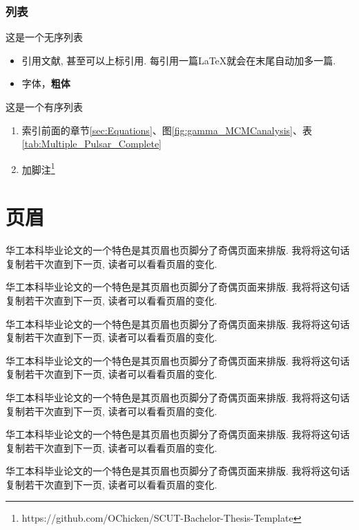 \documentclass{scutbthesis}
\begin{document}
\subsubsection{列表}
\label{sec:font_list_etc:list}
这是一个无序列表
\begin{itemize}
\item 引用文献\cite{long2015fully}, 甚至可以上标引用. 每引用一篇\LaTeX 就会在末尾自动加多一篇.
\item 字体{\color{red}{变红}}，\textbf{粗体}
\end{itemize}

这是一个有序列表
\begin{enumerate}
\item 索引前面的章节\ref{sec:Equations}、图\ref{fig:gamma_MCMCanalysis}、表\ref{tab:Multiple_Pulsar_Complete}
\item 加脚注\footnote{https://github.com/OChicken/SCUT-Bachelor-Thesis-Template}
\end{enumerate}

\pagebreak[4]

\section{页眉}
华工本科毕业论文的一个特色是其页眉也页脚分了奇偶页面来排版. 我将将这句话复制若干次直到下一页, 读者可以看看页眉的变化.

华工本科毕业论文的一个特色是其页眉也页脚分了奇偶页面来排版. 我将将这句话复制若干次直到下一页, 读者可以看看页眉的变化.

华工本科毕业论文的一个特色是其页眉也页脚分了奇偶页面来排版. 我将将这句话复制若干次直到下一页, 读者可以看看页眉的变化.

华工本科毕业论文的一个特色是其页眉也页脚分了奇偶页面来排版. 我将将这句话复制若干次直到下一页, 读者可以看看页眉的变化.

华工本科毕业论文的一个特色是其页眉也页脚分了奇偶页面来排版. 我将将这句话复制若干次直到下一页, 读者可以看看页眉的变化.

华工本科毕业论文的一个特色是其页眉也页脚分了奇偶页面来排版. 我将将这句话复制若干次直到下一页, 读者可以看看页眉的变化.

华工本科毕业论文的一个特色是其页眉也页脚分了奇偶页面来排版. 我将将这句话复制若干次直到下一页, 读者可以看看页眉的变化.
\end{document}
